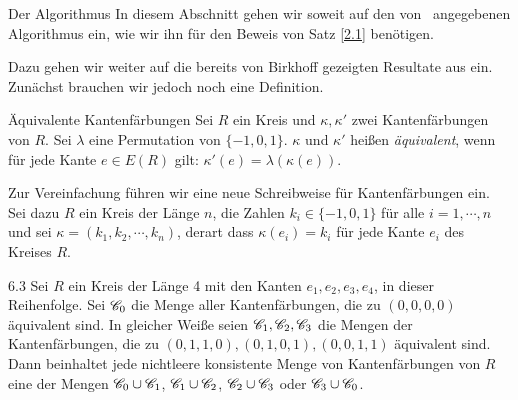 \begin{section}{Der Algorithmus}
 In diesem Abschnitt gehen wir soweit auf den von \rsst\-\  angegebenen Algorithmus ein, wie wir ihn für den Beweis von Satz \ref{2.1} benötigen.
 
 Dazu gehen wir weiter auf die bereits von Birkhoff gezeigten Resultate aus \cite{AmJMath35} ein. Zunächst brauchen wir jedoch noch eine Definition.
 
 \begin{definition}{Äquivalente Kantenfärbungen}
  Sei $R$ ein Kreis und $\kappa,\kappa'$ zwei Kantenfärbungen von $R$. Sei $\lambda$ eine Permutation von $\{-1,0,1\}$. $\kappa$ und $\kappa'$ heißen \textit{äquivalent}, wenn für jede Kante $e\in E(R)$ gilt: $\kappa'(e) = \lambda(\kappa(e))$.
 \end{definition}

 Zur Vereinfachung führen wir eine neue Schreibweise für Kantenfärbungen ein. Sei dazu $R$ ein Kreis der Länge $n$, die Zahlen $k_i \in \{-1,0,1\}$ für alle $i = 1,\cdots,n$ und sei $\kappa = (k_1,k_2,\cdots,k_n)$, derart dass $\kappa(e_i) = k_i$ für jede Kante $e_i$ des Kreises $R$.
 
 \begin{lemmal}{ }{6.3}
  Sei $R$ ein Kreis der Länge 4 mit den Kanten $e_1,e_2,e_3,e_4$, in dieser Reihenfolge. Sei $\mathscr{C}_0$ die Menge aller Kantenfärbungen, die zu $(0,0,0,0)$ äquivalent sind. In gleicher Weiße seien $\mathscr{C}_1,\mathscr{C}_2,\mathscr{C}_3$ die Mengen der Kantenfärbungen, die zu $(0,1,1,0),(0,1,0,1),(0,0,1,1)$ äquivalent sind. Dann beinhaltet jede nichtleere konsistente Menge von Kantenfärbungen von $R$ eine der Mengen $\mathscr{C}_0 \cup \mathscr{C}_1$, $\mathscr{C}_1 \cup \mathscr{C}_2$, $\mathscr{C}_2 \cup \mathscr{C}_3$ oder $\mathscr{C}_3 \cup \mathscr{C}_0$.
 \end{lemmal}
 

\end{section}

